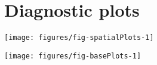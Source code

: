 \documentclass[a4paper,11pt]{article}\usepackage[]{graphicx}\usepackage[]{color}
\makeatletter
\def\maxwidth{ %
  \ifdim\Gin@nat@width>\linewidth
    \linewidth
  \else
    \Gin@nat@width
  \fi
}
\newenvironment{knitrout}{}{} %
\makeatother
\begin{document}
\clearpage

\section{Diagnostic plots}
\begin{knitrout}
\color{fgcolor}

{\centering \texttt{[image: figures/fig-spatialPlots-1]} 

}



\end{knitrout}
\newpage
\begin{knitrout}
\color{fgcolor}

{\centering \texttt{[image: figures/fig-basePlots-1]} 

}



\end{knitrout}
\newpage

\end{document}
